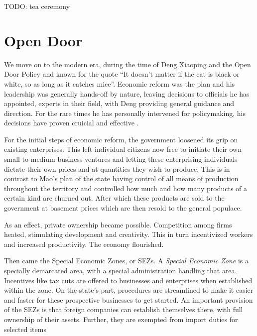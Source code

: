 TODO: tea ceremony

\section{Open Door}


We move on to the modern era, during the time of Deng Xiaoping and the Open Door
Policy and known for the quote ``It doesn't matter if the cat is black or white, so
as long as it catches mice''. Economic reform was the plan and his leadership
was generally hands-off by nature, leaving decisions to officials he has
appointed, experts in their field, with Deng providing general guidance and
direction. For the rare times he has personally intervened for policymaking, his
decisions have proven cruicial and effective \autocite{naughton_deng_1993}.

For the initial steps of economic reform, the government loosened its grip on
existing enterprises. This left individual citizens now free to initiate their own
small to medium business ventures and letting these enterprising individuals dictate
their own prices and at quantities they wish to produce. This is in contrast to
Mao's plan of the state having control of all means of production throughout the
territory and controlled how much and how many products of a certain kind are
churned out. After which these products are sold to the government at basement
prices which are then resold to the general populace.

As an effect, private ownership became possible. Competition among firms heated,
stimulating development and creativity. This in turn incentivized workers and
increased productivity. The economy flourished.


Then came the Special Economic Zones, or SEZs. A \emph{Special Economic Zone} is a
specially demarcated area, with a special administration handling that area.
Incentives like tax cuts are offered to businesses and enterprises when
established within the zone. On the state's part, procedures are streamlined to
make it easier and faster for these prospective businesses to get started.
An important provision of the SEZs is that foreign companies can establish
themselves there, with full ownership of their assets. Further, they are
exempted from import duties for selected items
\autocites{zeng_how_2011}{jaggi_chinas_1996}

